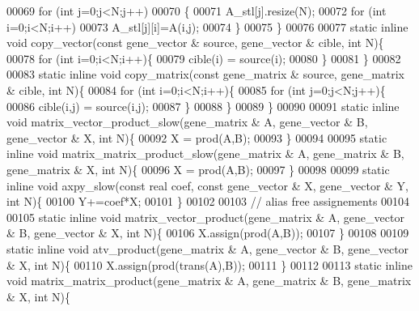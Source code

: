 \begin{DoxyCode}
00069     \textcolor{keywordflow}{for} (\textcolor{keywordtype}{int} j=0;j<N;j++)
00070     \{
00071       A\_stl[j].resize(N);
00072       \textcolor{keywordflow}{for} (\textcolor{keywordtype}{int} i=0;i<N;i++)
00073         A\_stl[j][i]=A(i,j);
00074     \}
00075   \}
00076 
00077   \textcolor{keyword}{static} \textcolor{keyword}{inline} \textcolor{keywordtype}{void} copy\_vector(\textcolor{keyword}{const} gene\_vector & source, gene\_vector & cible, \textcolor{keywordtype}{int} N)\{
00078     \textcolor{keywordflow}{for} (\textcolor{keywordtype}{int} i=0;i<N;i++)\{
00079       cible(i) = source(i);
00080     \}
00081   \}
00082 
00083   \textcolor{keyword}{static} \textcolor{keyword}{inline} \textcolor{keywordtype}{void} copy\_matrix(\textcolor{keyword}{const} gene\_matrix & source, gene\_matrix & cible, \textcolor{keywordtype}{int} N)\{
00084     \textcolor{keywordflow}{for} (\textcolor{keywordtype}{int} i=0;i<N;i++)\{
00085       \textcolor{keywordflow}{for} (\textcolor{keywordtype}{int} j=0;j<N;j++)\{
00086         cible(i,j) = source(i,j);
00087       \}
00088     \}
00089   \}
00090 
00091   \textcolor{keyword}{static} \textcolor{keyword}{inline} \textcolor{keywordtype}{void} matrix\_vector\_product\_slow(gene\_matrix & A, gene\_vector & B, gene\_vector & X, \textcolor{keywordtype}{int} N)\{
00092     X =  prod(A,B);
00093   \}
00094 
00095   \textcolor{keyword}{static} \textcolor{keyword}{inline} \textcolor{keywordtype}{void} matrix\_matrix\_product\_slow(gene\_matrix & A, gene\_matrix & B, gene\_matrix & X, \textcolor{keywordtype}{int} N)\{
00096     X =  prod(A,B);
00097   \}
00098 
00099   \textcolor{keyword}{static} \textcolor{keyword}{inline} \textcolor{keywordtype}{void} axpy\_slow(\textcolor{keyword}{const} real coef, \textcolor{keyword}{const} gene\_vector & X, gene\_vector & Y, \textcolor{keywordtype}{int} N)\{
00100     Y+=coef*X;
00101   \}
00102 
00103   \textcolor{comment}{// alias free assignements}
00104 
00105   \textcolor{keyword}{static} \textcolor{keyword}{inline} \textcolor{keywordtype}{void} matrix\_vector\_product(gene\_matrix & A, gene\_vector & B, gene\_vector & X, \textcolor{keywordtype}{int} N)\{
00106     X.assign(prod(A,B));
00107   \}
00108 
00109   \textcolor{keyword}{static} \textcolor{keyword}{inline} \textcolor{keywordtype}{void} atv\_product(gene\_matrix & A, gene\_vector & B, gene\_vector & X, \textcolor{keywordtype}{int} N)\{
00110     X.assign(prod(trans(A),B));
00111   \}
00112 
00113   \textcolor{keyword}{static} \textcolor{keyword}{inline} \textcolor{keywordtype}{void} matrix\_matrix\_product(gene\_matrix & A, gene\_matrix & B, gene\_matrix & X, \textcolor{keywordtype}{int} N)\{

\end{DoxyCode}
